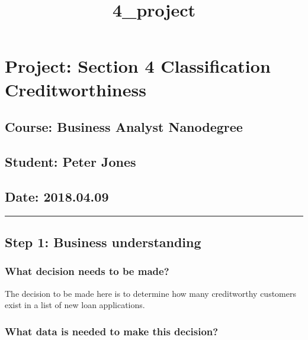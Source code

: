 \documentclass[11pt]{article}
\title{4\_project}
\begin{document}
    
    
    \maketitle
    
    

    
    \section{Project: Section 4 \textbar{} Classification \textbar{}
Creditworthiness}\label{project-section-4-classification-creditworthiness}

    \subsection{Course: Business Analyst
Nanodegree}\label{course-business-analyst-nanodegree}

\subsection{Student: Peter Jones}\label{student-peter-jones}

\subsection{Date: 2018.04.09}\label{date-2018.04.09}

    \begin{center}\rule{0.5\linewidth}{\linethickness}\end{center}

    \subsection{Step 1: Business
understanding}\label{step-1-business-understanding}

    \subsubsection{What decision needs to be
made?}\label{what-decision-needs-to-be-made}

The decision to be made here is to determine how many creditworthy
customers exist in a list of new loan applications.

    \subsubsection{What data is needed to make this
decision?}\label{what-data-is-needed-to-make-this-decision}
\end{document}
